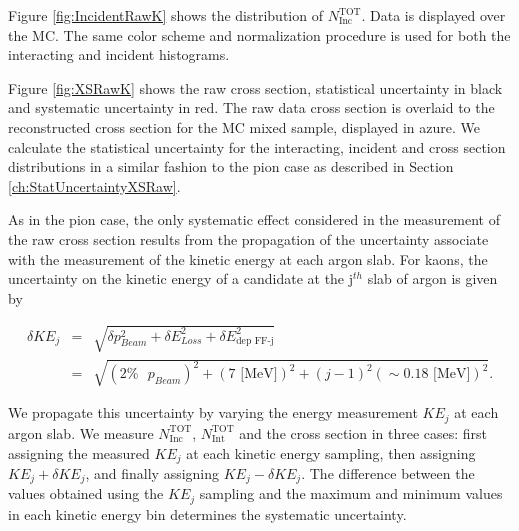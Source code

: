 Figure \ref{fig:IncidentRawK} shows the distribution of  $N^{\text{TOT}}_{\text{Inc}}$. Data is displayed over the MC. The same color scheme and normalization procedure is used for both the interacting and incident histograms. 


Figure \ref{fig:XSRawK} shows the raw cross section, statistical uncertainty in black and systematic uncertainty in red. The raw data cross section is overlaid to the reconstructed cross section for the MC mixed sample, displayed in azure.  We calculate the statistical uncertainty for the interacting, incident and cross section distributions in a similar fashion to the pion case as described in Section \ref{ch:StatUncertaintyXSRaw}. 

As in the pion case, the only systematic effect considered in the measurement of the raw cross section results from the propagation of the uncertainty associate with the measurement of the kinetic energy at each argon slab. For kaons, the uncertainty on the kinetic energy of a candidate at the j$^{th}$ slab of argon  is given by

\begin{eqnarray}
\delta KE_{j} &=& \sqrt{\delta p_{Beam}^2 + \delta E_{Loss}^2 +  \delta  E_{\text{dep FF-j}}^2}\\
&=& \sqrt{(2\% \text{ }p_{Beam})^2 +  (7 \text{ [MeV]})^2 +  (j-1)^2 (\sim0.18\text{ [MeV]})^2}.
\end{eqnarray}

We propagate this uncertainty  by varying the energy measurement $KE_{j}$ at each argon slab. We measure $N^{\text{TOT}}_{\text{Inc}}$,  $N^{\text{TOT}}_{\text{Int}}$ and the cross section  in three cases: first assigning the measured $KE_{j}$ at each kinetic energy sampling, then assigning $KE_{j} + \delta KE_{j}$, and finally assigning $KE_{j} - \delta KE_{j}$. The difference between the values obtained using the $KE_{j}$ sampling and the maximum and minimum values in each kinetic energy bin determines the systematic uncertainty.


